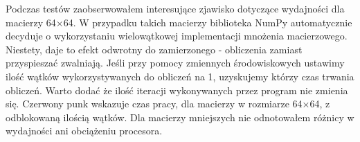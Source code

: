 \documentclass[10pt, a4paper]{article}
\begin{document}
\begin{sloppypar}
    Podczas testów zaobserwowałem interesujące zjawisko dotyczące wydajności dla macierzy
    64×64. W przypadku takich macierzy biblioteka NumPy automatycznie decyduje o
    wykorzystaniu wielowątkowej implementacji mnożenia macierzowego. Niestety, daje to
    efekt odwrotny do zamierzonego - obliczenia zamiast przyspieszać zwalniają. Jeśli przy
    pomocy zmiennych środowiskowych ustawimy ilość wątków wykorzystywanych do obliczeń na
    1, uzyskujemy którzy czas trwania obliczeń. Warto dodać że ilość iteracji wykonywanych
    przez program nie zmienia się. Czerwony punk wskazuje czas pracy, dla macierzy w rozmiarze
    64×64, z odblokowaną ilością wątków. Dla macierzy mniejszych nie odnotowałem różnicy
    w wydajności ani obciążeniu procesora.






\end{sloppypar}
\end{document}
